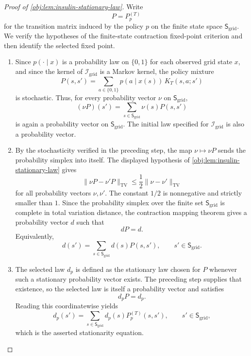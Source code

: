 \documentclass[11pt]{article}
\begin{document}
\begin{proof}[Proof of \cref{obj:lem:insulin-stationary-law}]
Write
\[
P=P_p^{(T)}
\]
for the transition matrix induced by the policy \(p\) on the finite state space
\(\mathsf S_{\mathrm{grid}}\). We verify the hypotheses of the finite-state
contraction fixed-point criterion and then identify the selected fixed point.

\begin{enumerate}
\item Since \(p(\cdot\mid x)\) is a probability law on \(\{0,1\}\) for each
observed grid state \(x\), and since the kernel of \(\mathcal I_{\mathrm{grid}}\)
is a Markov kernel, the policy mixture
\[
P(s,s')
=
\sum_{a\in\{0,1\}} p(a\mid x(s))\,K_T(s,a;s')
\]
is stochastic. Thus, for every probability vector \(\nu\) on
\(\mathsf S_{\mathrm{grid}}\),
\[
(\nu P)(s')=\sum_{s\in\mathsf S_{\mathrm{grid}}}\nu(s)P(s,s')
\]
is again a probability vector on \(\mathsf S_{\mathrm{grid}}\). The initial law specified for \(\mathcal I_{\mathrm{grid}}\) is also a probability
vector. %

\item By the stochasticity verified in the preceding step, the map
\(\nu\mapsto \nu P\) sends the probability simplex into itself. The displayed
hypothesis of \cref{obj:lem:insulin-stationary-law} gives
\[
\|\nu P-\nu'P\|_{\mathrm{TV}}
\le
\frac12\|\nu-\nu'\|_{\mathrm{TV}}
\]
for all probability vectors \(\nu,\nu'\). The constant \(1/2\) is nonnegative
and strictly smaller than \(1\). Since the probability simplex over the finite
set \(\mathsf S_{\mathrm{grid}}\) is complete in total variation distance, the
contraction mapping theorem gives a probability vector \(d\) such that
\[
dP=d .
\]
Equivalently,
\[
d(s')=\sum_{s\in\mathsf S_{\mathrm{grid}}}d(s)P(s,s'),
\qquad s'\in\mathsf S_{\mathrm{grid}} .
\]

\item The selected law \(d_p\) is defined as the stationary law chosen for
\(P\) whenever such a stationary probability vector exists. The preceding step
supplies that existence, so the selected law is itself a probability vector and
satisfies
\[
d_pP=d_p .
\]
Reading this coordinatewise yields
\[
d_p(s')
=
\sum_{s\in\mathsf S_{\mathrm{grid}}}d_p(s)P_p^{(T)}(s,s'),
\qquad s'\in\mathsf S_{\mathrm{grid}} ,
\]
which is the asserted stationarity equation. %
\end{enumerate}
\end{proof}
\end{document}
